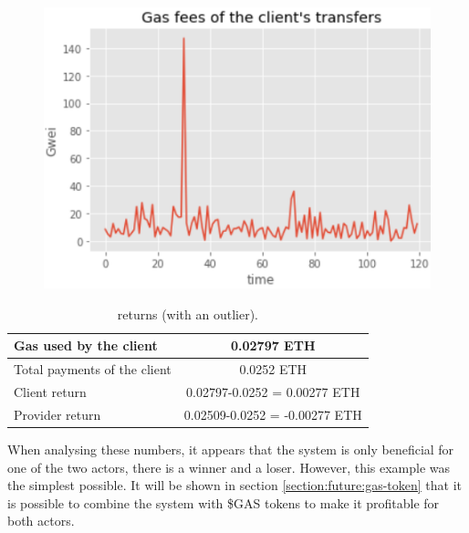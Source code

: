 \begin{figure}[h]
\centering
\includegraphics[scale=0.55]{figures/gas fees client transfer outlier.png}
\label{fig:gas-price-with-outlier}
\end{figure}


\begin{table}[htbp]
\caption{{\projectName} returns (with an outlier).}
\begin{center}
\begin{tabular}{|l|c|}
\hline
Gas used by the client & 0.02797 ETH \\
\hline
Total payments of the client & 0.0252 ETH \\
\hline
Client return &  0.02797-0.0252 = 0.00277 ETH \\
\hline
Provider return &  0.02509-0.0252  = -0.00277 ETH \\
\hline
\end{tabular}
\label{tab:variables:application-3}
\end{center}
\end{table}

When analysing these numbers, it appears that the system is only beneficial for one of the two actors, there is a winner and a loser. However, this example was the simplest possible. It will be shown in section \ref{section:future:gas-token} that it is possible to combine the system with \$GAS tokens to make it profitable for both actors.   